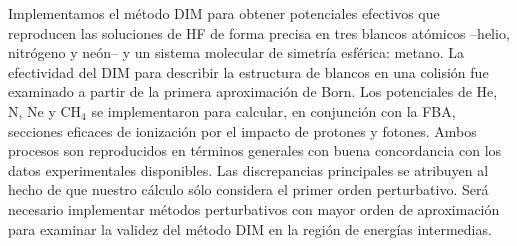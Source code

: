 Implementamos el método DIM para obtener potenciales efectivos que 
reproducen las soluciones de HF de forma precisa en tres blancos 
atómicos --helio, nitrógeno y neón-- y un sistema molecular de simetría 
esférica: metano. La efectividad del DIM para describir la estructura de 
blancos en una colisión fue examinado a partir de la primera 
aproximación de Born. Los potenciales de He, N, Ne y CH$_4$ se 
implementaron para calcular, en conjunción con la FBA, secciones 
eficaces de ionización por el impacto de protones y fotones. Ambos 
procesos son reproducidos en términos generales con buena concordancia 
con los datos experimentales disponibles. Las discrepancias principales 
se atribuyen al hecho de que nuestro cálculo sólo considera el primer 
orden perturbativo. Será necesario implementar métodos perturbativos con 
mayor orden de aproximación para examinar la validez del método DIM en 
la región de energías intermedias.





